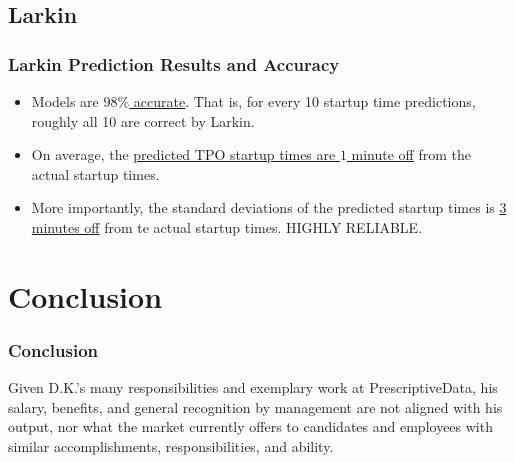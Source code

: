 \documentclass{beamer}
\begin{document}
\subsection{Larkin}
\begin{frame}
\frametitle{Larkin Prediction Results and Accuracy}
\begin{itemize}
	\item Models are \underline{$98\%$ accurate}. That is, for every 10 startup time predictions, roughly all 10 are correct by Larkin.
	\item On average, the \underline{predicted TPO startup times are $1$ minute off} from the actual startup times.
\item More importantly, the standard deviations of the predicted startup times is 
	\underline{3 minutes off} from te actual startup times. HIGHLY RELIABLE.
\end{itemize}
\end{frame}

\section{Conclusion}
\begin{frame}
	\frametitle{Conclusion}
Given D.K.'s many responsibilities and exemplary work at PrescriptiveData, his salary, benefits, and general recognition by management are not aligned with his output, nor what the market currently offers to candidates and employees with similar accomplishments, responsibilities, and ability.
\end{frame}
\end{document}
